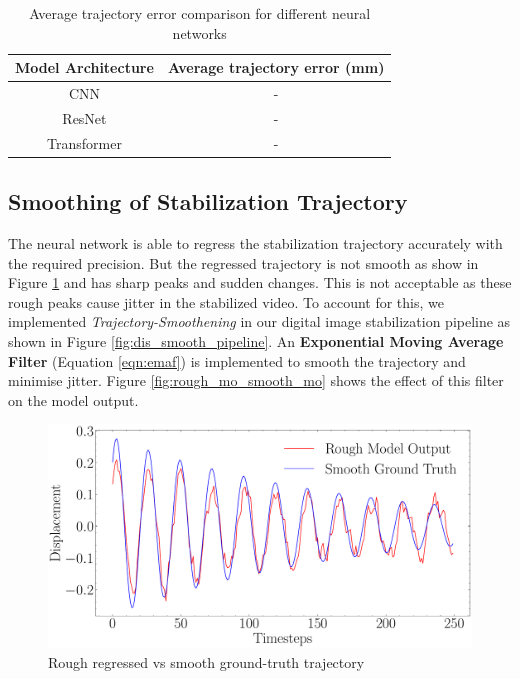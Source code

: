 \begin{table}[H]
    \centering
    \begin{tabular}{|c|c|}
    \hline
        \textbf{Model Architecture} & \textbf{Average trajectory error (mm)} \\
    \hline
        CNN & - \\
        ResNet & - \\
        Transformer & - \\
    \hline
    \end{tabular}
    \caption{Average trajectory error comparison for different neural networks}
    \label{tab:model_comparison}
\end{table}

\subsection{Smoothing of Stabilization Trajectory}
The neural network is able to regress the stabilization trajectory accurately with the required precision. But the regressed trajectory is not smooth as show in Figure \ref{fig:rough_mo_smooth_gt} and has sharp peaks and sudden changes. This is not acceptable as these rough peaks cause jitter in the stabilized video. To account for this, we implemented \textit{Trajectory-Smoothening} in our digital image stabilization pipeline as shown in Figure \ref{fig:dis_smooth_pipeline}. An \textbf{Exponential Moving Average Filter} (Equation \ref{eqn:emaf}) is implemented to smooth the trajectory and minimise jitter. Figure \ref{fig:rough_mo_smooth_mo} shows the effect of this filter on the model output.

\begin{figure}[H]
    \centering
    \includegraphics[scale=0.41]{images/fig_chapter4/nn_related/rough_mo_smooth_gt.pdf}
    \caption{Rough regressed vs smooth ground-truth trajectory}
    \label{fig:rough_mo_smooth_gt}
\end{figure}

